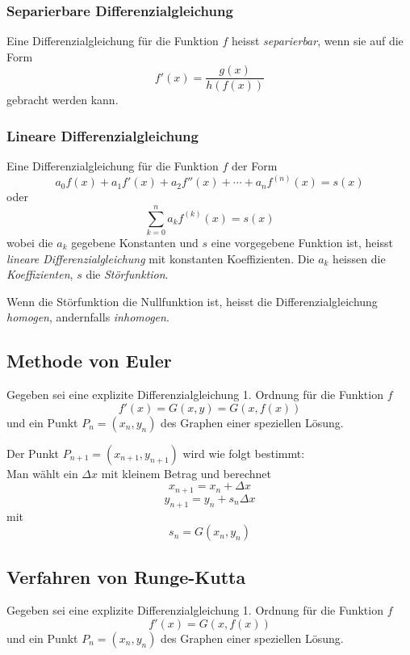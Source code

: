 \documentclass[10pt,a4paper]{scrartcl}
\begin{document}
\subsubsection{Separierbare Differenzialgleichung}

Eine Differenzialgleichung für die Funktion $f$ heisst \emph{separierbar}, wenn
sie auf die Form
$$f'(x) = \frac{g(x)}{h(f(x))}$$
gebracht werden kann.


\subsubsection{Lineare Differenzialgleichung}

Eine Differenzialgleichung für die Funktion $f$ der Form
$$a_0 f(x) + a_1 f'(x) + a_2 f''(x) + \dotsb + a_n f^{(n)}(x) = s(x)$$
oder
$$\sum\limits_{k=0}^n a_k f^{(k)}(x) = s(x)$$
wobei die $a_k$ gegebene Konstanten und $s$ eine vorgegebene Funktion ist,
heisst \emph{lineare Differenzialgleichung} mit konstanten Koeffizienten. Die
$a_k$ heissen die \emph{Koeffizienten}, $s$ die \emph{Störfunktion}.

Wenn die Störfunktion die Nullfunktion ist, heisst die Differenzialgleichung
\emph{homogen}, andernfalls \emph{inhomogen}.


\subsection{Methode von Euler}

Gegeben sei eine explizite Differenzialgleichung 1. Ordnung für die Funktion $f$
$$f'(x) = G(x, y) = G(x,f(x))$$
und ein Punkt $P_n = (x_n,y_n)$ des Graphen einer speziellen Lösung.

Der Punkt $P_{n+1} = (x_{n+1}, y_{n+1})$ wird wie folgt bestimmt:\\
Man wählt ein $\Delta{x}$ mit kleinem Betrag und berechnet
$$x_{n+1} = x_n + \Delta x$$
$$y_{n+1} = y_n + s_n\Delta x$$
mit
$$s_n = G(x_n,y_n)$$


\subsection{Verfahren von Runge-Kutta}

Gegeben sei eine explizite Differenzialgleichung 1. Ordnung für die Funktion $f$
$$f'(x) = G(x, f(x))$$
und ein Punkt $P_n = (x_n, y_n)$ des Graphen einer speziellen Lösung.
\end{document}
